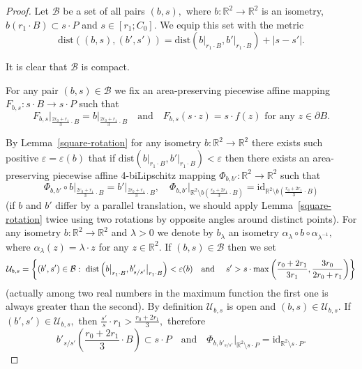 \documentclass[12pt]{article}
\theoremstyle{definition}
\begin{document}
\begin{proof}

Let $\mathcal B$ be a set of all pairs $(b,s),$ where $b:\mathbb R^2\to\mathbb R^2$ is an isometry, $b(r_1\cdot B)\subset s\cdot P$ and $s\in[r_1;C_0].$ We equip this set with the metric
$$
\mathrm{dist}\left((b,s),(b',s')\right) = \mathrm{dist}\left(b\big|_{r_1\cdot B},b'\big|_{r_1\cdot B}\right) + \left|s-s'\right|.
$$

It is clear that $\mathcal B$ is compact.

For any pair $(b,s)\in\mathcal B$ we fix an area-preserving piecewise affine mapping $F_{b,s}:s\cdot B\to s\cdot P$ such that
$$F_{b,s}\big|_{\frac{2r_0+r_1}3\cdot B} = b\big|_{\frac{2r_0+r_1}3\cdot B}
\quad\text{and}\quad
F_{b,s}(s\cdot z) = s\cdot f(z)
\text{ for any }
z\in\partial B.$$

By Lemma~\ref{square-rotation} for any isometry $b:\mathbb R^2\to\mathbb R^2$ there exists such positive $\varepsilon = \varepsilon(b)$ that if $\mathrm{dist}(b\big|_{r_1\cdot B},b'\big|_{r_1\cdot B})<\varepsilon$ then there exists an area-preserving piecewise affine 4-biLipschitz mapping $\Phi_{b,b'}:\mathbb R^2\to\mathbb R^2$ such that
$$
\Phi_{b,b'}\circ b\big|_{\frac{2r_0+r_1}3\cdot B} = b'\big|_{\frac{2r_0+r_1}3\cdot B},\quad
\Phi_{b,b'}\big|_{\mathbb R^2\setminus b\left(\frac{r_0+2r_1}3\cdot B\right)} = \mathrm{id}_{\mathbb R^2\setminus b\left(\frac{r_0+2r_1}3\cdot B\right)}
$$
(if $b$ and $b'$ differ by a parallel translation, we should apply Lemma~\ref{square-rotation} twice using two rotations by opposite angles around distinct points). For any isometry $b:\mathbb R^2\to\mathbb R^2$ and $\lambda > 0$ we denote by $b_{\lambda}$ an isometry $\alpha_{\lambda}\circ b\circ\alpha_{\lambda^{-1}},$ where $\alpha_{\lambda}(z) = \lambda\cdot z$ for any $z\in\mathbb R^2.$ If $(b,s)\in\mathcal B$ then we set
$$
\mathcal U_{b,s} = \left\{(b',s')\in\mathcal B:\ \mathrm{dist}\left(b\big|_{r_1\cdot B}, b'_{s/s'}\big|_{r_1\cdot B} \right)<\varepsilon(b)\text{\quad and \quad} s' > s\cdot\max\left(\frac{r_0+2r_1}{3r_1},\frac{3r_0}{2r_0+r_1} \right)  \right\}
$$
(actually among two real numbers in the maximum function the first one is always greater than the second). By definition $\mathcal U_{b,s}$ is open and $(b,s)\in\mathcal U_{b,s}.$ If $(b',s')\in\mathcal U_{b,s},$ then $\frac{s'}{s}\cdot r_1 > \frac{r_0+2r_1}3,$ therefore
$$b'_{s/s'}\left(\frac{r_0+2r_1}3\cdot B\right)\subset s\cdot P
\quad\text{and}\quad
\Phi_{b, b'_{s/s'}}\big|_{\mathbb R^2\setminus s\cdot P} = \mathrm{id}_{\mathbb R^2\setminus s\cdot P}.
$$


\end{proof}
\end{document}

